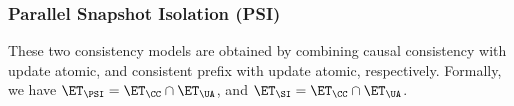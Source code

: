 
\subsubsection{Parallel Snapshot Isolation (PSI)} 
These two consistency models are obtained by combining causal consistency with update atomic, 
and consistent prefix with update atomic, respectively. Formally, we have 
$\ET_{\PSI} = \ET_{\CC} \cap \ET_{\UA}$, and $\ET_{\SI} = \ET_{\CC} \cap \ET_{\UA}$.

